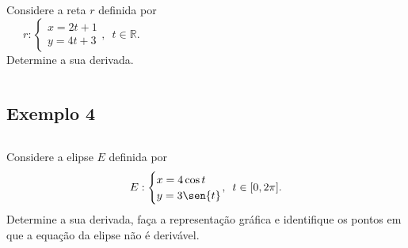 \begin{frame}
  \begin{columns}[onlytextwidth]
    \vspace{-15pt}
      \begin{example}%
        Considere a reta $r$ definida por \begin{equation*}
          r: \begin{cases}
            x = 2t + 1 \\ y = 4t + 3
          \end{cases}\!\!\!\!\!\!\!,\,\,\,t\in\mathbb{R}.
        \end{equation*}
        Determine a sua derivada.
      \end{example}
    \hfill
  \end{columns}
\end{frame}

\subsection{Exemplo 4}
\begin{frame}
  \begin{columns}[onlytextwidth]
    \vspace{-15pt}
      \begin{example}%
        Considere a elipse $E$ definida por \begin{equation*}
          E: \begin{cases}
            x = 4\cos{t} \\ y = 3\sen{t}
          \end{cases}\!\!\!\!\!\!\!,\,\,\,t\in[0,2\pi].
        \end{equation*}
        Determine a sua derivada, faça a \mbox{representação} gráfica e identifique os pontos em que a \mbox{equação} da elipse não é derivável.
      \end{example}
    \hfill
          \only<1>{}
  \end{columns}
\end{frame}